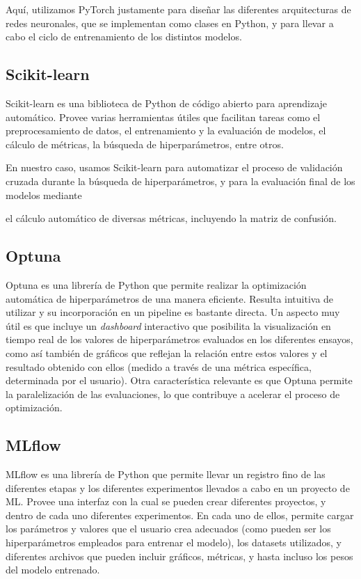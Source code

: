 \documentclass[../../main.tex]{subfiles}
\begin{document}
Aquí, utilizamos PyTorch justamente para diseñar las diferentes arquitecturas de redes
neuronales, que se implementan como clases en Python, y para llevar a cabo el ciclo de
entrenamiento de los distintos modelos.

\subsection{Scikit-learn}
Scikit-learn \cite{scikitlearn-docs} es una biblioteca de Python de código abierto para
aprendizaje automático. Provee varias herramientas útiles que facilitan tareas como el
preprocesamiento de datos, el entrenamiento y la evaluación de modelos, el cálculo de
métricas, la búsqueda de hiperparámetros, entre otros.

En nuestro caso, usamos Scikit-learn para automatizar el proceso de validación cruzada
durante la búsqueda de hiperparámetros, y para la evaluación final de los modelos mediante

el cálculo automático de diversas métricas, incluyendo la matriz de confusión.

\subsection{Optuna}
Optuna \cite{optuna-docs} es una librería de Python que permite realizar la optimización
automática de hiperparámetros de una manera eficiente. Resulta intuitiva de utilizar y su
incorporación en un pipeline es bastante directa. Un aspecto muy útil es que incluye un
\textit{dashboard} interactivo que posibilita la visualización en tiempo real de los
valores de hiperparámetros evaluados en los diferentes ensayos, como así también de
gráficos que reflejan la relación entre estos valores y el resultado obtenido con ellos
(medido a través de una métrica específica, determinada por el usuario). Otra
característica relevante es que Optuna permite la paralelización de las evaluaciones, lo
que contribuye a acelerar el proceso de optimización.

\subsection{MLflow}
MLflow \cite{mlflow-docs} es una librería de Python que permite llevar un registro fino de
las diferentes etapas y los diferentes experimentos llevados a cabo en un proyecto de ML.
Provee una interfaz con la cual se pueden crear diferentes proyectos, y dentro de cada uno
diferentes experimentos. En cada uno de ellos, permite cargar los parámetros y valores que
el usuario crea adecuados (como pueden ser los hiperparámetros empleados para entrenar el
modelo), los datasets utilizados, y diferentes archivos que pueden incluir gráficos,
métricas, y hasta incluso los pesos del modelo entrenado.
\end{document}
